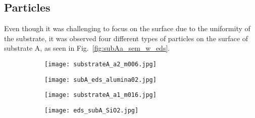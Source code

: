 \subsection{Particles}
Even though it was challenging to focus on the surface due to the uniformity of the substrate, it was observed four different types of particles on the surface of substrate A, as seen in Fig.~\ref{fig:subAa_sem_w_eds}.

\begin{figure}
    \centering
    \begin{subfigure}[t]{\textwidth}
        \caption{}\label{fig:subAa_polishing-grit}
          \begin{minipage}[t]{0.43\linewidth}
            \centering
            \texttt{[image: substrateA\_a2\_m006.jpg]}
          \end{minipage}
          \hfill
          \begin{minipage}[t]{0.43\linewidth}
            \centering
            \texttt{[image: subA\_eds\_alumina02.jpg]}
          \end{minipage}
          \begin{minipage}[t]{0.11\linewidth}
            \centering
            \atomicTable[&][&][&]
          \end{minipage}
    \end{subfigure}
    \par\bigskip
    \begin{subfigure}[t]{\textwidth}
        \caption{}\label{fig:subAa_large-grit}
          \begin{minipage}[t]{0.43\linewidth}
            \centering
            \texttt{[image: substrateA\_a1\_m016.jpg]}
          \end{minipage}
          \hfill
          \begin{minipage}[t]{0.43\linewidth}
            \centering
            \texttt{[image: eds\_subA\_SiO2.jpg]}
          \end{minipage}
          \begin{minipage}[t]{0.11\linewidth}
            \centering
            \atomicTable[&][&][&]
          \end{minipage}
    \end{subfigure}
    \par\bigskip
    \begin{subfigure}[t]{\textwidth}
        \caption{}\label{fig:subAa_czt-particle}
          \begin{minipage}[t]{0.43\linewidth}

\end{minipage}
\end{subfigure}
\end{figure}
